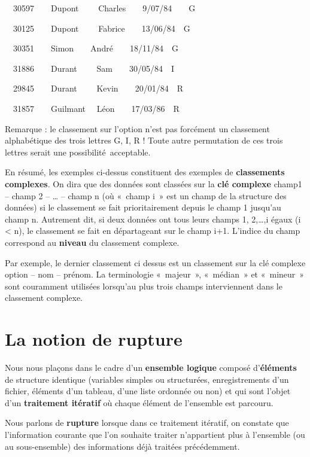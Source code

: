 {\sffamily
\ \ 30597\ \ \ \ Dupont \ \ \ \ Charles\ \ \ \ 9/07/84\ \ \ \ G}

{\sffamily
\ \ 30125\ \ \ \ Dupont \ \ \ \ Fabrice\ \ \ \ 13/06/84\ \ G}

{\sffamily
\ \ 30351\ \ \ \ Simon\ \ \ \ André\ \ \ \ 18/11/84\ \ G}

{\sffamily
\ \ 31886\ \ \ \ Durant \ \ \ \ Sam\ \ \ \ 30/05/84\ \ I}

{\sffamily
\ \ 29845\ \ \ \ Durant \ \ \ \ Kevin\ \ \ \ 20/01/84\ \ R}

{\sffamily
\ \ 31857\ \ \ \ Guilmant \ \ Léon\ \ \ \ 17/03/86\ \ R}

{
Remarque : le classement sur l’option n’est pas forcément un classement
alphabétique des trois lettres G, I, R ! Toute autre permutation de ces
trois lettres serait une possibilité~acceptable.}

{
En résumé, les exemples ci-dessus constituent des exemples de
\textbf{classements complexes}. On dira que des données sont classées
sur la \textbf{clé complexe} champ1 – champ 2 – … – champ n (où «~champ
i~» est un champ de la structure des données) si le classement se fait
prioritairement depuis le champ 1 jusqu’au champ n. Autrement dit, si
deux données ont tous leurs champs 1, 2,…,i égaux (i {\textless} n), le
classement se fait en départageant sur le champ i+1. L’indice du champ
correspond au \textbf{niveau} du classement complexe.}

{
Par exemple, le dernier classement ci dessus est un classement sur la
clé complexe option – nom – prénom. La terminologie «~majeur~»,
«~médian~» et «~mineur~» sont couramment utilisées lorsqu’au plus trois
champs interviennent dans le classement complexe.}

\section{La notion de rupture}
{
Nous nous plaçons dans le cadre d’un \textbf{ensemble logique} composé
d’\textbf{éléments} de structure identique (variables simples ou
structurées, enregistrements d’un fichier, éléments d’un tableau, d’une
liste ordonnée ou non) et qui sont l’objet d’un \textbf{traitement
itératif} où chaque élément de l’ensemble est parcouru. }

{
Nous parlons de \textbf{rupture} lorsque dans ce traitement itératif, on
constate que l’information courante que l’on souhaite traiter
n’appartient plus à l’ensemble (ou au sous-ensemble) des informations
déjà traitées précédemment. }

